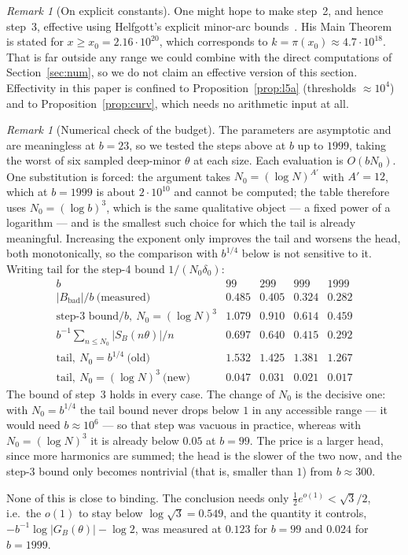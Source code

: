\documentclass[11pt,a4paper]{article}
\theoremstyle{plain}
\theoremstyle{definition}
\theoremstyle{remark}
\newtheorem{remark}[theorem]{Remark}
\begin{document}
\begin{remark}[On explicit constants]\label{rem:helfgott}
One might hope to make step~2, and hence step~3, effective using Helfgott's
explicit minor-arc
bounds~\cite{Hel12}. His Main Theorem is stated for $x\ge x_0=2.16\cdot10^{20}$,
which corresponds to $k=\pi(x_0)\approx4.7\cdot10^{18}$. That is far outside any
range we could combine with the direct computations of Section~\ref{sec:num}, so
we do not claim an effective version of this section. Effectivity in this paper
is confined to Proposition~\ref{prop:l5a} (thresholds $\approx10^{4}$) and to
Proposition~\ref{prop:curv}, which needs no arithmetic input at all.
\end{remark}

\begin{remark}[Numerical check of the budget]\label{rem:budget}
The parameters are asymptotic and are meaningless at $b=23$, so we tested the
steps above at $b$ up to $1999$, taking the worst of six sampled deep-minor
$\theta$ at each size. Each evaluation is $O(bN_0)$. One substitution is forced:
the argument takes $N_0=(\log N)^{A'}$ with $A'=12$, which at $b=1999$ is about
$2\cdot10^{10}$ and cannot be computed; the table therefore uses
$N_0=(\log b)^{3}$, which is the same qualitative object --- a fixed power of a
logarithm --- and is the smallest such choice for which the tail is already
meaningful. Increasing the exponent only improves the tail and worsens the head,
both monotonically, so the comparison with $b^{1/4}$ below is not sensitive to
it. Writing $\mathrm{tail}$ for the step-4 bound $1/(N_0\delta_0)$:
\[
  \begin{array}{l|cccc}
    b & 99 & 299 & 999 & 1999\\\hline
    |B_{\mathrm{bad}}|/b\ \text{(measured)} & 0.485 & 0.405 & 0.324 & 0.282\\
    \text{step-3 bound}/b,\ N_0=(\log N)^{3} & 1.079 & 0.910 & 0.614 & 0.459\\
    b^{-1}\sum_{n\le N_0}|S_B(n\theta)|/n & 0.697 & 0.640 & 0.415 & 0.292\\\hline
    \mathrm{tail},\ N_0=b^{1/4}\ \text{(old)} & 1.532 & 1.425 & 1.381 & 1.267\\
    \mathrm{tail},\ N_0=(\log N)^{3}\ \text{(new)} & 0.047 & 0.031 & 0.021 & 0.017
  \end{array}
\]
The bound of step~3 holds in every case. The change of $N_0$ is the decisive
one: with $N_0=b^{1/4}$ the tail bound never drops below $1$ in any accessible
range --- it would need $b\approx10^{6}$ --- so that step was vacuous in
practice, whereas with $N_0=(\log N)^{3}$ it is already below $0.05$ at $b=99$.
The price is a larger head, since more harmonics are summed; the head is the
slower of the two now, and the step-3 bound only becomes nontrivial (that is,
smaller than $1$) from $b\approx300$.

None of this is close to binding. The conclusion needs only
$\tfrac12e^{o(1)}<\sqrt3/2$, i.e.\ the $o(1)$ to stay below
$\log\sqrt3=0.549$, and the quantity it controls,
$-b^{-1}\log|G_B(\theta)|-\log2$, was measured at $0.123$ for $b=99$ and $0.024$
for $b=1999$.
\end{remark}
\end{document}
